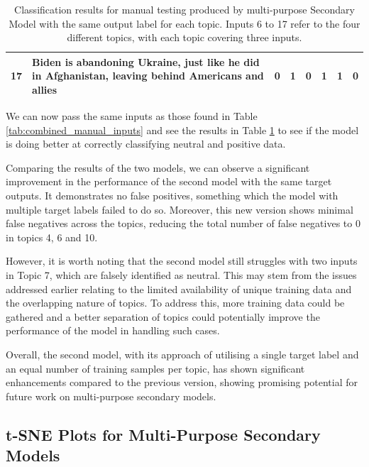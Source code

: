 \begin{table}[ht]
{\begin{tabular}{lp{10cm}cccccc}
            17                                 & Biden is abandoning Ukraine, just like he did in Afghanistan, leaving behind Americans and allies                          & 0                                & 1               & 0       & 1      & 1      & 0               \\
            \bottomrule
        \end{tabular}%
    }
    \vspace{5pt}
    \caption{Classification results for manual testing produced by multi-purpose Secondary Model with the same output label for each topic. Inputs 6 to 17 refer to the four different topics, with each topic covering three inputs.}
    \label{tab:combined_sl_manual_inputs}
\end{table}

We can now pass the same inputs as those found in Table \ref{tab:combined_manual_inputs} and see the results in Table \ref{tab:combined_sl_manual_inputs} to see if the model is doing better at correctly classifying neutral and positive data.

Comparing the results of the two models, we can observe a significant improvement in the performance of the second model with the same target outputs. It demonstrates no false positives, something which the model with multiple target labels failed to do so. Moreover, this new version shows minimal false negatives across the topics, reducing the total number of false negatives to 0 in topics 4, 6 and 10.

However, it is worth noting that the second model still struggles with two inputs in Topic 7, which are falsely identified as neutral. This may stem from the issues addressed earlier relating to the limited availability of unique training data and the overlapping nature of topics. To address this, more training data could be gathered and a better separation of topics could potentially improve the performance of the model in handling such cases.

Overall, the second model, with its approach of utilising a single target label and an equal number of training samples per topic, has shown significant enhancements compared to the previous version, showing promising potential for future work on multi-purpose secondary models.

\subsection{t-SNE Plots for Multi-Purpose Secondary Models}

